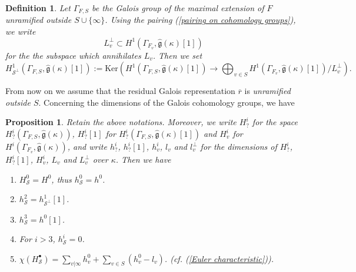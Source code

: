 \documentclass[12pt,oneside,reqno]{amsart}
\theoremstyle{plain}
\newtheorem{definition}[theorem]{Definition}
\newtheorem{proposition}[theorem]{Proposition}
\begin{document}
	
	
	\begin{definition}
		Let
		$\Gamma_{F,S}$
		be the Galois group of the maximal extension of
		$F$ unramified outside $S\cup\{\infty\}$.
		Using the pairing (\ref{pairing on cohomology groups}), we write
		\[
		L_v^\perp
		\subset
		H^1(\Gamma_{F_v},
		\widehat{\mathfrak{g}}(\kappa)[1])
		\]
		for the the subspace which annihilates
		$L_v$.
		Then we set
		\[
		H^1_{\mathcal{S}^\perp}
		(\Gamma_{F,S},
		\widehat{\mathfrak{g}}(\kappa)[1])
		:=
		\mathrm{Ker}
		\left(
		H^1(\Gamma_{F,S},
		\widehat{\mathfrak{g}}(\kappa)[1])
		\rightarrow
		\bigoplus_{v\in S}
		H^1
		(\Gamma_{F_v},
		\widehat{\mathfrak{g}}(\kappa)[1])/L_v^\perp
		\right).
		\]
	\end{definition}
	
	
	
	
	
	From now on we assume that the residual Galois representation $\overline{r}$ is \emph{unramified outside $S$}.	
	Concerning the dimensions of the
	Galois cohomology groups,
	we have
	\begin{proposition}
		Retain the above notations.
		Moreover, we write
		$H_?^i$
		for the space
		$H_?^i(\Gamma_{F,S},
		\widehat{\mathfrak{g}}(\kappa))$,
		$H_?^i[1]$
		for
		$H_?^i(\Gamma_{F,S},
		\widehat{\mathfrak{g}}(\kappa)[1])$
		and
		$H^i_v$ for
		$H^i(\Gamma_{F_v},
		\widehat{\mathfrak{g}}(\kappa))$,
		and write
		$h^i_?$,
		$h^i_?[1]$,
		$h^i_v$, $l_v$ and
		$l_v^\perp$
		for the dimensions of
		$H^i_?$,
		$H^i_?[1]$,
		$H^i_v$, $L_v$
		and
		$L_v^\perp$
		over $\kappa$. Then we have
		\begin{enumerate}
			\item 
			$H^0_{\mathcal{S}}
			=
			H^0$,
			thus
			$h^0_\mathcal{S}=h^0$.
			
			
			
			\item
			$h^2_{\mathcal{S}}
			=
			h^1_{\mathcal{S}^\perp}[1]$.
			
			
			\item 
			$
			h^3_{\mathcal{S}}
			=
			h^0[1]$.
			
			\item 
			For $i>3$,
			$h^i_{\mathcal{S}}=0$.
			
			\item 
			$\chi
			(H_{\mathcal{S}}^\bullet)
			=
			\sum_{v |\infty}h_v^0
			+
			\sum_{v\in S}
			(h_v^0-l_v)$.
			(\emph{cf.}
			(\ref{Euler characteristic})).
		\end{enumerate}
	\end{proposition}
	
\end{document}
